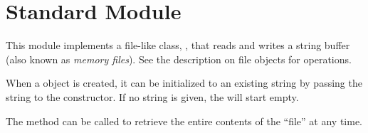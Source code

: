 \section{Standard Module }


This module implements a file-like class, ,
that reads and writes a string buffer (also known as {\em memory
files}). See the description on file objects for operations.

When a  object is created, it can be initialized
to an existing string by passing the string to the constructor.
If no string is given, the  will start empty.

The method  can be called to retrieve the
entire contents of the ``file'' at any time.
